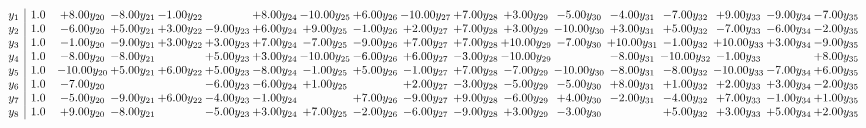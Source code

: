 \documentclass[9pt]{article}
\begin{document}
\[\begin{array}{c| c c@{\hskip 2pt} c@{\hskip 2pt} c@{\hskip 2pt} c@{\hskip 2pt} c@{\hskip 2pt} c@{\hskip 2pt} c@{\hskip 2pt} c@{\hskip 2pt} c@{\hskip 2pt} c@{\hskip 2pt} c@{\hskip 2pt} c@{\hskip 2pt} c@{\hskip 2pt} c@{\hskip 2pt} c@{\hskip 2pt} c@{\hskip 2pt} }
 y_{1}   &  1.0 & +  8.00 y_{20} & -8.00 y_{21} & -1.00 y_{22} &   & +  8.00 y_{24} & -10.00 y_{25} & +  6.00 y_{26} & -10.00 y_{27} & +  7.00 y_{28} & +  3.00 y_{29} & -5.00 y_{30} & -4.00 y_{31} & -7.00 y_{32} & +  9.00 y_{33} & -9.00 y_{34} & -7.00 y_{35}\\
 y_{2}   &  1.0 & -6.00 y_{20} & +  5.00 y_{21} & +  3.00 y_{22} & -9.00 y_{23} & +  6.00 y_{24} & +  9.00 y_{25} & -1.00 y_{26} & +  2.00 y_{27} & +  7.00 y_{28} & +  3.00 y_{29} & -10.00 y_{30} & +  3.00 y_{31} & +  5.00 y_{32} & -7.00 y_{33} & -6.00 y_{34} & -2.00 y_{35}\\
 y_{3}   &  1.0 & -1.00 y_{20} & -9.00 y_{21} & +  3.00 y_{22} & +  3.00 y_{23} & +  7.00 y_{24} & -7.00 y_{25} & -9.00 y_{26} & +  7.00 y_{27} & +  7.00 y_{28} & + 10.00 y_{29} & -7.00 y_{30} & + 10.00 y_{31} & -1.00 y_{32} & + 10.00 y_{33} & +  3.00 y_{34} & -9.00 y_{35}\\
 y_{4}   &  1.0 & -8.00 y_{20} & -8.00 y_{21} &   & +  5.00 y_{23} & +  3.00 y_{24} & -10.00 y_{25} & -6.00 y_{26} & +  6.00 y_{27} & -3.00 y_{28} & -10.00 y_{29} &   & -8.00 y_{31} & -10.00 y_{32} & -1.00 y_{33} &   & +  8.00 y_{35}\\
 y_{5}   &  1.0 & -10.00 y_{20} & +  5.00 y_{21} & +  6.00 y_{22} & +  5.00 y_{23} & -8.00 y_{24} & -1.00 y_{25} & +  5.00 y_{26} & -1.00 y_{27} & +  7.00 y_{28} & -7.00 y_{29} & -10.00 y_{30} & -8.00 y_{31} & -8.00 y_{32} & -10.00 y_{33} & -7.00 y_{34} & +  6.00 y_{35}\\
 y_{6}   &  1.0 & -7.00 y_{20} &    &   & -6.00 y_{23} & -6.00 y_{24} & +  1.00 y_{25} &   & +  2.00 y_{27} & -3.00 y_{28} & -5.00 y_{29} & -5.00 y_{30} & +  8.00 y_{31} & +  1.00 y_{32} & +  2.00 y_{33} & +  3.00 y_{34} & -2.00 y_{35}\\
 y_{7}   &  1.0 & -5.00 y_{20} & -9.00 y_{21} & +  6.00 y_{22} & -4.00 y_{23} & -1.00 y_{24} &   & +  7.00 y_{26} & -9.00 y_{27} & +  9.00 y_{28} & -6.00 y_{29} & +  4.00 y_{30} & -2.00 y_{31} & -4.00 y_{32} & +  7.00 y_{33} & -1.00 y_{34} & +  1.00 y_{35}\\
 y_{8}   &  1.0 & +  9.00 y_{20} & -8.00 y_{21} &   & -5.00 y_{23} & +  3.00 y_{24} & +  7.00 y_{25} & -2.00 y_{26} & -6.00 y_{27} & -9.00 y_{28} & +  3.00 y_{29} & -3.00 y_{30} &   & +  5.00 y_{32} & +  3.00 y_{33} & +  5.00 y_{34} & +  2.00 y_{35}\\

\end{array}\]
\end{document}
